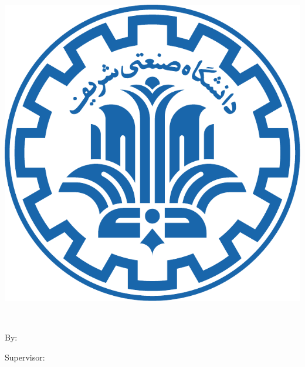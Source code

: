 
\pagestyle{empty}

\begin{center}

\begin{latin}

\includegraphics[scale=0.25]{front/template/images/logo}

\EnglishThesisUniversity \\
\EnglishThesisDepartment

\begin{large}
\vspace{0.2cm}
\EnglishThesisType


\vspace{1cm}

{\Large\textbf\EnglishThesisTitle}

\vspace{1cm}

{\normalsize By:}\\
\textbf{\EnglishThesisAuthor}

\vspace{0.8cm}

{\normalsize Supervisor:}\\ 
\textbf{\EnglishThesisSupervisor}

\end{large}

\vspace{1.5cm}
\EnglishThesisDate

\end{latin}

\end{center}

